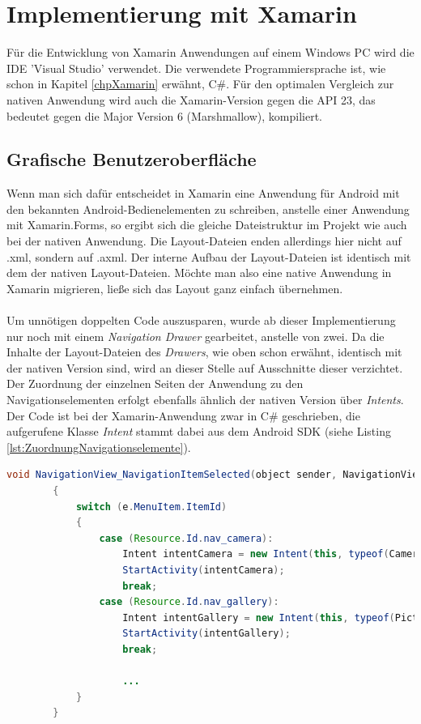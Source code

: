 \section{Implementierung mit Xamarin}

Für die Entwicklung von Xamarin Anwendungen auf einem Windows PC wird die IDE 'Visual Studio' verwendet. Die verwendete Programmiersprache ist, wie schon in Kapitel \ref{chpXamarin} erwähnt, C\#. Für den optimalen Vergleich zur nativen Anwendung wird auch die Xamarin-Version gegen die API 23, das bedeutet gegen die Major Version 6 (Marshmallow), kompiliert. 

\subsection*{Grafische Benutzeroberfläche}

Wenn man sich dafür entscheidet in Xamarin eine Anwendung für Android mit den bekannten Android-Bedienelementen zu schreiben, anstelle einer Anwendung mit Xamarin.Forms, so ergibt sich die gleiche Dateistruktur im Projekt wie auch bei der nativen Anwendung. Die Layout-Dateien enden allerdings hier nicht auf .xml, sondern auf .axml. Der interne Aufbau der Layout-Dateien ist identisch mit dem der nativen Layout-Dateien. Möchte man also eine native Anwendung in Xamarin migrieren, ließe sich das Layout ganz einfach übernehmen. 
\\
\\
Um unnötigen doppelten Code auszusparen, wurde ab dieser Implementierung nur noch mit einem \textit{Navigation Drawer} gearbeitet, anstelle von zwei. Da die Inhalte der Layout-Dateien des \textit{Drawers}, wie oben schon erwähnt, identisch mit der nativen Version sind, wird an dieser Stelle auf Ausschnitte dieser verzichtet. Der Zuordnung der einzelnen Seiten der Anwendung zu den Navigationselementen erfolgt ebenfalls ähnlich der nativen Version über \textit{Intents}. Der Code ist bei der Xamarin-Anwendung zwar in C\# geschrieben, die aufgerufene Klasse \textit{Intent} stammt dabei aus dem Android SDK (siehe Listing \ref{lst:ZuordnungNavigationselemente}). 

\begin{lstlisting}[caption=Zuweisung der einzelnen Seiten der Anwendung zu den Navigationselementen im Navigation Drawer, label=lst:ZuordnungNavigationselemente, language=Java]
void NavigationView_NavigationItemSelected(object sender, NavigationView.NavigationItemSelectedEventArgs e)
        {
            switch (e.MenuItem.ItemId)
            {
                case (Resource.Id.nav_camera):
                    Intent intentCamera = new Intent(this, typeof(CameraActivity));
                    StartActivity(intentCamera);
                    break;
                case (Resource.Id.nav_gallery):
                    Intent intentGallery = new Intent(this, typeof(PictureGalleryActivity));
                    StartActivity(intentGallery);
                    break;
                    
                    ...
            }
        }
\end{lstlisting}


